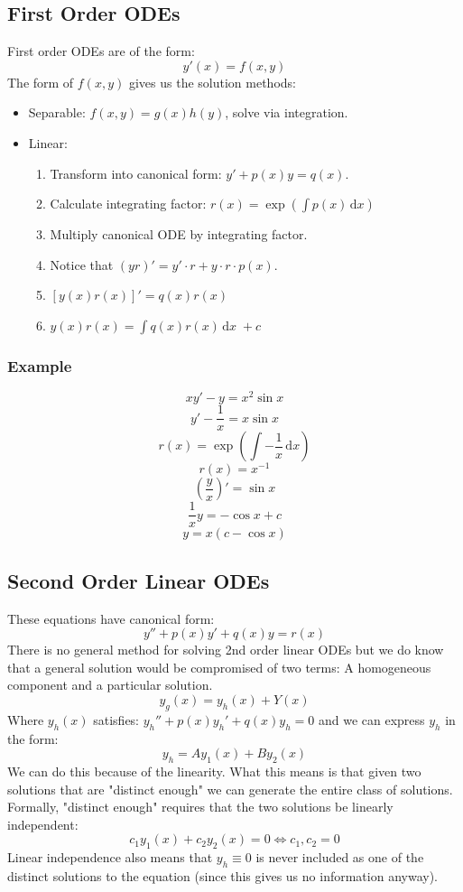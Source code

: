 \documentclass[12pt]{article}
\begin{document}
\subsection{First Order ODEs}
First order ODEs are of the form:
\[y'(x)=f(x,y)\]
The form of \(f(x,y)\) gives us the solution methods:
\begin{itemize}
    \item Separable: \(f(x,y)=g(x)h(y)\), solve via integration.
    \item Linear:
    \begin{enumerate}
        \item Transform into canonical form: \(y'+p(x)y=q(x)\).
        \item Calculate integrating factor: \(r(x)=\exp(\int p(x)\,\text{d}x)\)
        \item Multiply canonical ODE by integrating factor.
        \item Notice that \((yr)'=y'\cdot r+y\cdot r\cdot p(x)\).
        \item \([y(x)r(x)]'=q(x)r(x)\)
        \item \(y(x)r(x)=\int q(x)r(x)\,\text{d}x\;+c\)
    \end{enumerate}
\end{itemize}
\subsubsection*{Example}
\[xy'-y=x^2\sin{x}\]
\[y'-\frac{1}{x}=x\sin{x}\]
\[r(x)=\exp{\left(\int -\frac{1}{x}\,\text{d}x\right)}\]
\[r(x)=x^{-1}\]
\[\left(\frac{y}{x}\right)'=\sin{x}\]
\[\frac{1}{x}y=-\cos{x}+c\]
\[y=x(c-\cos{x})\]
\subsection{Second Order Linear ODEs}
These equations have canonical form:
\[y''+p(x)y'+q(x)y=r(x)\]
There is no general method for solving 2nd order linear ODEs but we do know that a general solution would be compromised of two terms: A homogeneous component and a particular solution.
\[y_g(x)=y_h(x)+Y(x)\]
Where \(y_h(x)\) satisfies: \(y_h''+p(x)y_h'+q(x)y_h=0\) and we can express \(y_h\) in the form:
\[y_h=Ay_1(x)+By_2(x)\]
We can do this because of the linearity. What this means is that given two solutions that are "distinct enough" we can generate the entire class of solutions. Formally, "distinct enough" requires that the two solutions be linearly independent:
\[c_1y_1(x)+c_2y_2(x)=0\iff c_1,c_2=0\]
Linear independence also means that \(y_h\equiv 0\) is never included as one of the distinct solutions to the equation (since this gives us no information anyway).
\end{document}

